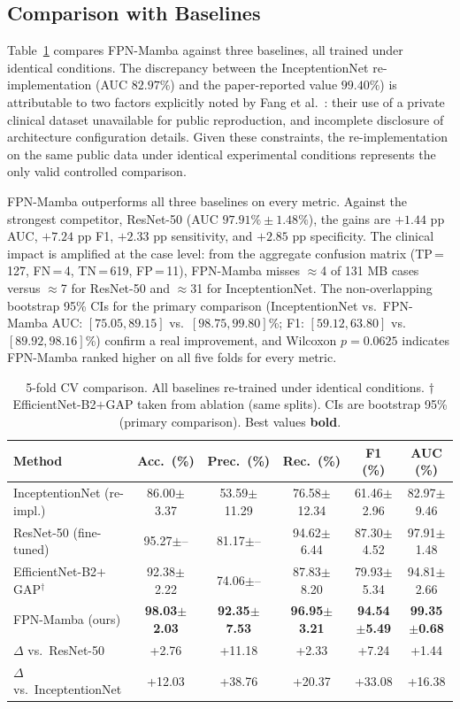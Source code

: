 \documentclass[runningheads]{llncs}
\begin{document}
\subsection{Comparison with Baselines}
Table~\ref{tab:main_results} compares FPN-Mamba against three baselines, all trained under identical conditions. The discrepancy between the InceptentionNet re-implementation (AUC $82.97\%$) and the paper-reported value $99.40\%$) is attributable to two factors explicitly noted by Fang et al.~\cite{fang2025}: their use of a private clinical dataset unavailable for public reproduction, and incomplete disclosure of architecture configuration details. Given these constraints, the re-implementation on the same public data under identical experimental conditions represents the only valid controlled comparison.

FPN-Mamba outperforms all three baselines on every metric. Against the strongest competitor, ResNet-50 (AUC $97.91\%\pm1.48\%$), the gains are $+1.44$ pp AUC, $+7.24$ pp F1, $+2.33$ pp sensitivity, and $+2.85$ pp specificity. The clinical impact is amplified at the case level: from the aggregate confusion matrix (TP\,=\,127, FN\,=\,4, TN\,=\,619, FP\,=\,11), FPN-Mamba misses $\approx$4 of 131 MB cases versus $\approx$7 for ResNet-50 and $\approx$31 for InceptentionNet. The non-overlapping bootstrap 95\% CIs for the primary comparison (InceptentionNet vs.\ FPN-Mamba AUC: $[75.05, 89.15]$ vs.\ $[98.75, 99.80]$\%; F1: $[59.12, 63.80]$ vs.\ $[89.92, 98.16]$\%) confirm a real improvement, and Wilcoxon $p=0.0625$ indicates FPN-Mamba ranked higher on all five folds for every metric.

\begin{table}[t]
\caption{5-fold CV comparison. All baselines re-trained under identical conditions. $\dagger$EfficientNet-B2$+$GAP taken from ablation (same splits). CIs are bootstrap 95\% (primary comparison). Best values \textbf{bold}.}\label{tab:main_results}
\centering
\small
\begin{tabular}{lccccc}
\toprule
\textbf{Method} & \textbf{Acc.\ (\%)} & \textbf{Prec.\ (\%)} & \textbf{Rec.\ (\%)} & \textbf{F1 (\%)} & \textbf{AUC (\%)} \\
\midrule
InceptentionNet \cite{fang2025} (re-impl.) & 86.00$\pm$3.37 & 53.59$\pm$11.29 & 76.58$\pm$12.34 & 61.46$\pm$2.96 & 82.97$\pm$9.46 \\
ResNet-50 (fine-tuned)                     & 95.27$\pm$-- & 81.17$\pm$-- & 94.62$\pm$6.44 & 87.30$\pm$4.52 & 97.91$\pm$1.48 \\
EfficientNet-B2$+$GAP$^\dagger$            & 92.38$\pm$2.22 & 74.06$\pm$-- & 87.83$\pm$8.20 & 79.93$\pm$5.34 & 94.81$\pm$2.66 \\
FPN-Mamba (ours)                           & \textbf{98.03$\pm$2.03} & \textbf{92.35$\pm$7.53} & \textbf{96.95$\pm$3.21} & \textbf{94.54$\pm$5.49} & \textbf{99.35$\pm$0.68} \\
\midrule
$\Delta$ vs.\ ResNet-50 & +2.76 & +11.18 & +2.33 & +7.24 & +1.44 \\
$\Delta$ vs.\ InceptentionNet & +12.03 & +38.76 & +20.37 & +33.08 & +16.38 \\
\bottomrule
\end{tabular}
\end{table}
\end{document}
